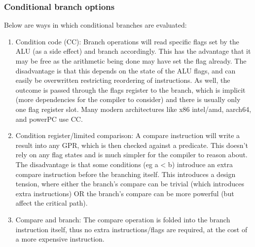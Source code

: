 \documentclass[11pt, a4paper]{article}
\theoremstyle{definition}
\theoremstyle{remark}
\begin{document}
\subsubsection{Conditional branch options}
Below are ways in which conditional branches are evaluated:
\begin{enumerate}
  \item Condition code (CC): Branch operations will read specific flags set by the ALU (as a side effect) and branch accordingly. This has the advantage that it may be free as the arithmetic being done may have set the flag already. The disadvantage is that this depends on the state of the ALU flags, and can easily be overwritten restricting reordering of instructions. As well, the outcome is passed through the flags register to the branch, which is implicit (more dependencies for the compiler to consider) and there is usually only one flag register slot. Many modern architectures like x86 intel/amd, aarch64, and powerPC use CC.
  \item Condition register/limited comparison: A compare instruction will write a result into any GPR, which is then checked against a predicate. This doesn't rely on any flag states and is much simpler for the compiler to reason about. The disadvantage is that some conditions (eg a < b) introduce an extra compare instruction before the branching itself. This introduces a design tension, where either the branch's compare can be trivial (which introduces extra instructions) OR the branch's compare can be more powerful (but affect the critical path).
  \item Compare and branch: The compare operation is folded into the branch instruction itself, thus no extra instructions/flags are required, at the cost of a more expensive instruction.
\end{enumerate}
\end{document}
